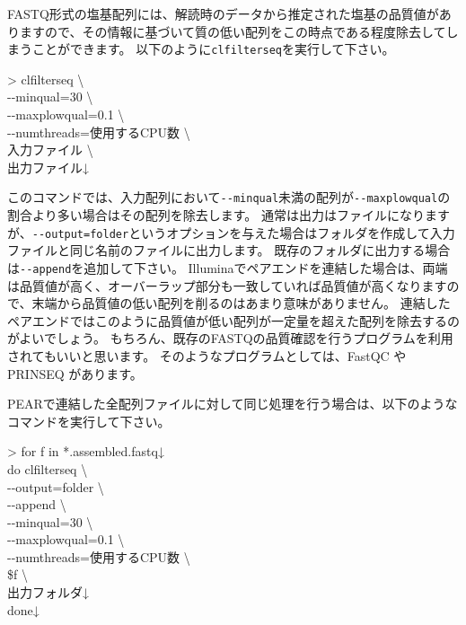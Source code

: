 \documentclass[titlepage,10pt,a4paper]{jsbook}
\newenvironment{cmd}{\begin{oframed}\raggedright\ttfamily\footnotesize\setlength{\baselineskip}{1.4em}}{\end{oframed}\vspace{-1em}}
\begin{document}
FASTQ形式の塩基配列には、解読時のデータから推定された塩基の品質値がありますので、その情報に基づいて質の低い配列をこの時点である程度除去してしまうことができます。
以下のように\texttt{clfilterseq}を実行して下さい。

\begin{cmd}
{\textgreater} clfilterseq {\textbackslash}\\
{-}{-}minqual=30 {\textbackslash}\\
{-}{-}maxplowqual=0.1 {\textbackslash}\\
{-}{-}numthreads=使用するCPU数 {\textbackslash}\\
入力ファイル {\textbackslash}\\
出力ファイル↓
\end{cmd}

このコマンドでは、入力配列において\texttt{{-}{-}minqual}未満の配列が\texttt{{-}{-}maxplowqual}の割合より多い場合はその配列を除去します。
通常は出力はファイルになりますが、\texttt{{-}{-}output=folder}というオプションを与えた場合はフォルダを作成して入力ファイルと同じ名前のファイルに出力します。
既存のフォルダに出力する場合は\texttt{{-}{-}append}を追加して下さい。
Illuminaでペアエンドを連結した場合は、両端は品質値が高く、オーバーラップ部分も一致していれば品質値が高くなりますので、末端から品質値の低い配列を削るのはあまり意味がありません。
連結したペアエンドではこのように品質値が低い配列が一定量を超えた配列を除去するのがよいでしょう。
もちろん、既存のFASTQの品質確認を行うプログラムを利用されてもいいと思います。
そのようなプログラムとしては、FastQC \citep{Andrews2010}やPRINSEQ \citep{Schmieder2011}があります。

PEARで連結した全配列ファイルに対して同じ処理を行う場合は、以下のようなコマンドを実行して下さい。

\begin{cmd}
{\textgreater} for f in *.assembled.fastq↓\\
do clfilterseq {\textbackslash}\\
{-}{-}output=folder {\textbackslash}\\
{-}{-}append {\textbackslash}\\
{-}{-}minqual=30 {\textbackslash}\\
{-}{-}maxplowqual=0.1 {\textbackslash}\\
{-}{-}numthreads=使用するCPU数 {\textbackslash}\\
\$f {\textbackslash}\\
出力フォルダ↓\\
done↓
\end{cmd}
\end{document}
